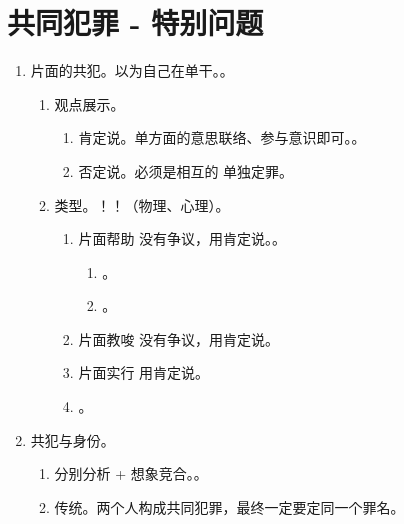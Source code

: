 \section{共同犯罪 - 特别问题}
\begin{enumerate}
  \item 片面的共犯。以为自己在单干。。
        \begin{enumerate}
          \item 观点展示。
                \begin{enumerate}
                  \item 肯定说。单方面的意思联络、参与意识即可。。
                  \item 否定说。必须是相互的 \yjt 单独定罪。
                \end{enumerate}
          \item 类型。！！（物理、心理）。
                \begin{enumerate}
                  \item 片面帮助 \yjt 没有争议，用肯定说。。
                        \begin{enumerate}
                          \item {}。
                          \item {}。
                        \end{enumerate}
                  \item 片面教唆 \yjt 没有争议，用肯定说。
                  \item 片面实行 \yjt 用肯定说。
                  \item {}。
                \end{enumerate}
        \end{enumerate}
  \item 共犯与身份。
        \begin{enumerate}
          \item 分别分析 + 想象竞合。。
          \item 传统。两个人构成共同犯罪，最终一定要定同一个罪名。

\end{enumerate}
\end{enumerate}
